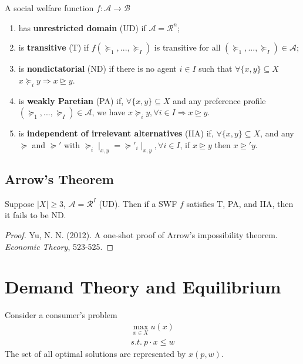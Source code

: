 \documentclass[11pt]{elegantbook}
\begin{document}
\begin{definition}
    \normalfont
    A social welfare function $f: \mathcal{A}\rightarrow \mathcal{B}$
    \begin{enumerate}[$\circ$]
        \item has \textbf{unrestricted domain} (UD) if $\mathcal{A}=\mathcal{R}^n$;
        \item is \textbf{transitive} (T) if $f(\succeq_1,...,\succeq_I)$ is transitive for all $(\succeq_1,...,\succeq_I)\in \mathcal{A}$;
        \item is \textbf{nondictatorial} (ND) if there is no agent $i\in I$ such that $\forall \{x,y\}\subseteq X$ $x\succeq_i y \Rightarrow x\trianglerighteq y$.
        \item is \textbf{weakly Paretian} (PA) if, $\forall \{x,y\}\subseteq X$ and any preference profile $(\succeq_1,...,\succeq_I)\in \mathcal{A}$, we have $x\succeq_i y,\forall i\in I \Rightarrow x\trianglerighteq y$.
        \item is \textbf{independent of irrelevant alternatives} (IIA) if, $\forall \{x,y\}\subseteq X$, and any $\succeq$ and $\succeq'$ with $\succeq_i\mid_{x,y}=\succeq'_i\mid_{x,y}, \forall i\in I$, if $x\trianglerighteq y$ then $x\trianglerighteq' y$.
    \end{enumerate}
\end{definition}


\subsection{Arrow's Theorem}
\begin{theorem}
    Suppose $|X|\geq 3$, $\mathcal{A}=\mathcal{R}^I$ (UD). Then if a SWF $f$ satisfies T, PA, and IIA, then it fails to be ND.
\end{theorem}
\begin{proof}
    \normalfont
    Yu, N. N. (2012). A one-shot proof of Arrow's impossibility theorem. \textit{Economic Theory}, 523-525.
\end{proof}


\section{Demand Theory and Equilibrium}
Consider a consumer's problem
\begin{equation}
    \begin{aligned}
        \max_{x\in X} u(x)\\
        s.t.\ p\cdot x\leq w
    \end{aligned}
    \tag{UMP}
    \label{UMP}
\end{equation}
The set of all optimal solutions are represented by $x(p,w)$.
\end{document}
